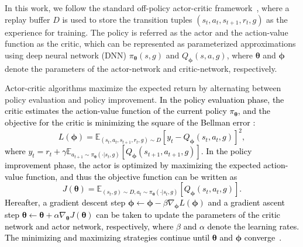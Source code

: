 \documentclass[journal]{IEEEtran}
\begin{document}

In this work, we follow the standard off-policy actor-critic framework~\citep{silver2014deterministic, heess2015learning, mnih2016asynchronous, fujimoto2018addressing, haarnoja2018soft}, where a replay buffer $D$ is used to store the transition tuples $(s_{t}, a_{t}, s_{t+1}, r_t, g)$ as the experience for training.
The policy is referred as the actor and the action-value function as the critic, which can be represented as parameterized approximations using deep neural network (DNN) $\pi_{\bm{\theta}}(s,g)$ and $Q_{\bm{\phi}}(s,a,g)$, where $\bm{\theta}$ and $\bm{\phi}$ denote the parameters of the actor-network and critic-network, respectively. 

Actor-critic algorithms maximize the expected return by alternating between policy evaluation and policy improvement. 
\textcolor{black}{In the policy evaluation phase, the critic estimates the action-value function of the current policy $\pi_{\bm{\theta}}$, and the objective for the critic is minimizing the square of the Bellman error \citep{bellman1966dynamic}:
\begin{equation}
L(\bm{\phi}) = \mathbb{E}_{(s_{t},a_{t},s_{t+1},r_{t},g)\sim D} \left[y_{t} - Q_{\bm{\phi}}(s_{t},a_{t},g)\right]^2,
\end{equation}
where $y_{t} = r_{t} + \gamma\mathbb{E}_{a_{t+1}\sim\pi_{\bm{\theta}}(\cdot|s_t,g)}\left[Q_{\bm{\phi}}(s_{t+1},a_{t+1},g)\right]$.
In the policy improvement phase, the actor is optimized by maximizing the expected action-value function, and thus the objective function can be written as
\begin{equation}
J(\bm{\theta}) = \mathbb{E}_{(s_t,g)\sim D, a_t\sim\pi_{\bm{\theta}}(\cdot|s_t,g)} \left[Q_{\bm{\phi}}(s_t,a_t,g)\right].
\end{equation}
Hereafter, a gradient descent step $\bm{\phi}\leftarrow \bm{\phi} - \beta\nabla_{\bm{\phi}}L(\bm{\phi})$ and a gradient ascent step $\bm{\theta}\leftarrow \bm{\theta} + \alpha\nabla_{\bm{\theta}}J(\bm{\theta})$ can be taken to update the parameters of the critic network and actor network, respectively, where $\beta$ and $\alpha$ denote the learning rates.
The minimizing and maximizing strategies continue until $\bm{\theta}$ and $\bm{\phi}$ converge~\citep{williams1992simple,duan2016benchmarking}.}
\end{document}
